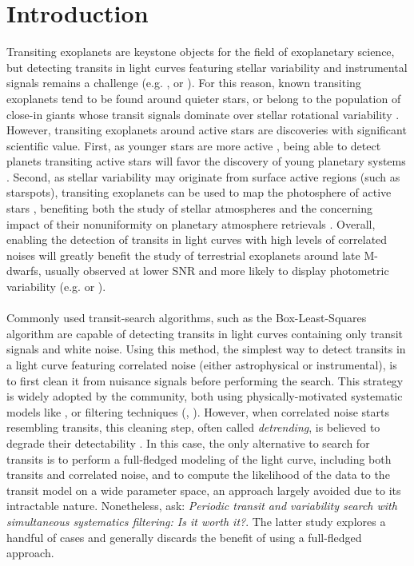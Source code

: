 \documentclass[modern]{aastex631}
\begin{document}
\section*{Introduction}
Transiting exoplanets are keystone objects for the field of exoplanetary science, but detecting transits in light curves featuring stellar variability and instrumental signals remains a challenge (e.g. \citealt{Pont2006}, \citealt{Howell2016} or \citealt{Yaptangco2024}). For this reason, known transiting exoplanets tend to be found around quieter stars, or belong to the population of close-in giants whose transit signals dominate over stellar rotational variability \citep{Simpson2023}. However, transiting exoplanets around active stars are discoveries with significant scientific value. First, as younger stars are more active \citep{Skumanich1972}, being able to detect planets transiting active stars will favor the discovery of young planetary systems \citep[e.g.][]{Newton2022}. Second, as stellar variability may originate from surface active regions (such as starspots), transiting exoplanets can be used to map the photosphere of active stars \citep[e.g.][]{Morris2017}, benefiting both the study of stellar atmospheres and the concerning impact of their nonuniformity on planetary atmosphere retrievals \citep{rackham2018}. Overall, enabling the detection of transits in light curves with high levels of correlated noises will greatly benefit the study of terrestrial exoplanets around late M-dwarfs, usually observed at lower SNR and more likely to display photometric variability (e.g. \citealt{Murray2020} or \citealt{Petrucci2024}).
\\\\
Commonly used transit-search algorithms, such as the Box-Least-Squares algorithm \citep[BLS,][]{bls} are capable of detecting transits in light curves containing only transit signals and white noise. Using this method, the simplest way to detect transits in a light curve featuring correlated noise (either astrophysical or instrumental), is to first clean it from nuisance signals before performing the search. This strategy is widely adopted by the community, both using physically-motivated systematic models like \cite{everest1, everest2}, or filtering techniques (\citealt{Jenkins2010}, \citealt{wotan}). However, when correlated noise starts resembling transits, this cleaning step, often called \textit{detrending}, is believed to degrade their detectability \cite[see subsection 4.3 of][]{wotan}. In this case, the only alternative to search for transits is to perform a full-fledged modeling of the light curve, including both transits and correlated noise, and to compute the likelihood of the data to the transit model on a wide parameter space, an approach largely avoided due to its intractable nature. Nonetheless, \cite{kovacs2016} ask: \textit{Periodic transit and variability search with simultaneous systematics filtering: Is it worth it?}. The latter study explores a handful of cases and generally discards the benefit of using a full-fledged approach.\\\\
\end{document}
